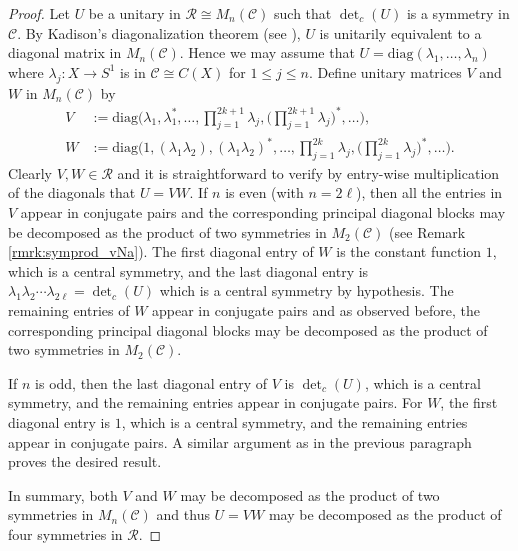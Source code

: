 \documentclass[12pt, preprint]{amsart}
\theoremstyle{definition}
\theoremstyle{remark}
\numberwithin{equation}{section}
\theoremstyle{ser}
\theoremstyle{serr}
\theoremstyle{ser}
\begin{document}
\begin{proof}
Let $U$ be a unitary in $\mathscr{R} \cong M_n(\mathscr{C})$ such that $\det _c (U)$ is a symmetry in $\mathscr{C}$. By Kadison's diagonalization theorem (see \cite[Lemma 3.7, Theorem 3.19]{diag_kadison}), $U$ is unitarily equivalent to a diagonal matrix in $M_n(\mathscr{C})$. Hence we may assume that $U = \mathrm{diag} (\lambda _1, \ldots, \lambda _n)$ where $\lambda _j : X \to S^1$ is in $\mathscr{C} \cong C(X)$ for $1 \le j \le n$. Define unitary matrices $V$ and $W$ in $M_n(\mathscr{C})$ by
\begin{align*}
    V &:= \mathrm{diag} \Big( \lambda _1, \lambda_1 ^*, \ldots, \prod_{j=1}^{2 k + 1} \lambda_{j}, \Big( \prod_{j=1}^{2 k +1} \lambda_{j} \Big)^*, \ldots \Big),\\
    W &:= \mathrm{diag} \Big( 1, (\lambda _1 \lambda _2), (\lambda_1 \lambda_2) ^*, \ldots, \prod_{j=1}^{2 k} \lambda_{j}, \Big( \prod_{j=1}^{2 k} \lambda_{j} \Big)^*, \ldots \Big).
\end{align*}
Clearly $V, W \in \mathscr{R}$ and it is straightforward to verify by entry-wise multiplication of the diagonals that $U = VW$.
If $n$ is even (with $n=2\ell$), then all the entries in $V$ appear in conjugate pairs and the corresponding principal diagonal blocks may be decomposed as the product of two symmetries in $M_2(\mathscr{C})$ (see Remark \ref{rmrk:symprod_vNa}). The first diagonal entry of $W$ is the constant function $1$, which is a central symmetry, and the last diagonal entry is $\lambda _1 \lambda _2 \cdots \lambda _{2 \ell} = \det_c(U)$ which is a central symmetry by hypothesis. The remaining entries of $W$ appear in conjugate pairs and as observed before, the corresponding principal diagonal blocks may be decomposed as the product of two symmetries in $M_2(\mathscr{C})$. 

If $n$ is odd, then the last diagonal entry of $V$ is $\det_c(U)$, which is a central symmetry, and the remaining entries appear in conjugate pairs. For $W$, the first diagonal entry is $1$, which is a central symmetry, and the remaining entries appear in conjugate pairs. A similar argument as in the previous paragraph proves the desired result.

In summary, both $V$ and $W$ may be decomposed as the product of two symmetries in $M_n(\mathscr{C})$ and thus $U = VW$ may be decomposed as the product of four symmetries in $\mathscr{R}$.
\end{proof}
\end{document}
